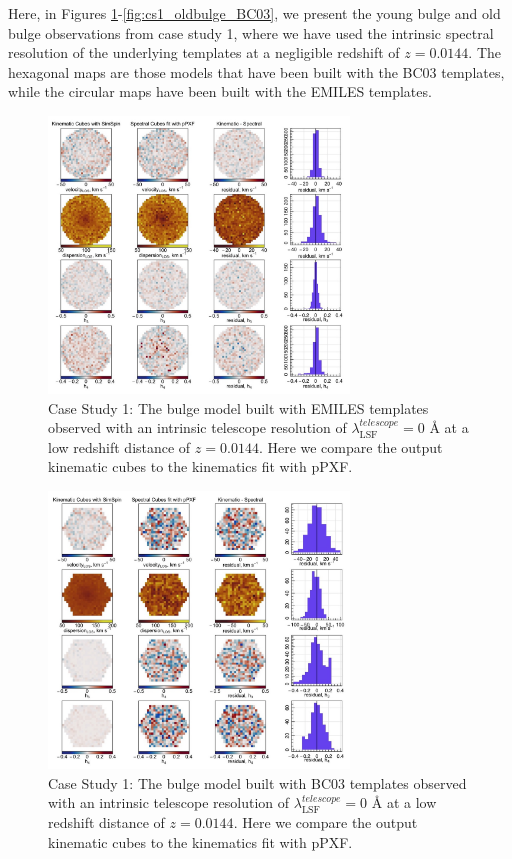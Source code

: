 \documentclass[
  journal=pasa,
  manuscript=research-paper, %
  year=2020,
  volume=37,
]{cup-journal}
\begin{document}
Here, in Figures \ref{fig:cs1_bulge_EMILES}-\ref{fig:cs1_oldbulge_BC03}, we present the young bulge and old bulge observations from case study 1, where we have used the intrinsic spectral resolution of the underlying templates at a negligible redshift of $z = 0.0144$. The hexagonal maps are those models that have been built with the BC03 templates, while the circular maps have been built with the EMILES templates. 

\begin{figure}
    \centering
    \includegraphics[keepaspectratio, width=8cm]{Figures/cs1_bulge_velocities_lowz_EMILES.jpeg}
    \caption{Case Study 1: The bulge model built with EMILES templates observed with an intrinsic telescope resolution of  $\lambda_{\text{LSF}}^{telescope} = 0$ \AA{} at a low redshift distance of $z = 0.0144$. Here we compare the output kinematic cubes to the kinematics fit with pPXF.}
    \label{fig:cs1_bulge_EMILES}
\end{figure}

\begin{figure}
    \centering
    \includegraphics[keepaspectratio, width=8cm]{Figures/cs1_bulge_velocities_lowz_BC03hr.jpeg}
    \caption{Case Study 1: The bulge model built with BC03 templates observed with an intrinsic telescope resolution of  $\lambda_{\text{LSF}}^{telescope} = 0$ \AA{} at a low redshift distance of $z = 0.0144$. Here we compare the output kinematic cubes to the kinematics fit with pPXF.}
    \label{fig:cs1_bulge_BC03}
\end{figure}
\end{document}

